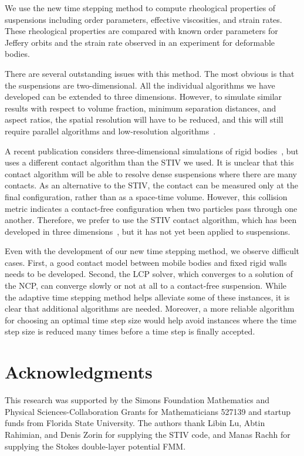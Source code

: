 \documentclass[AMA,STIX1COL]{WileyNJD-v2}
\begin{document}
We use the new time stepping method to compute rheological properties of
suspensions including order parameters, effective viscosities, and
strain rates.  These rheological properties are compared with known
order parameters for Jeffery orbits and the strain rate observed in an
experiment for deformable bodies.

There are several outstanding issues with this method. The most obvious
is that the suspensions are two-dimensional.  All the individual
algorithms we have developed can be extended to three dimensions.
However, to simulate similar results with respect to volume fraction,
minimum separation distances, and aspect ratios, the spatial resolution
will have to be reduced, and this will still require parallel algorithms
and low-resolution algorithms~\cite{Kabacogulu2017}.  

A recent publication considers three-dimensional simulations of rigid
bodies~\cite{cor-gre-rac-vee2017}, but uses a different contact
algorithm than the STIV we used.  It is unclear that this contact
algorithm will be able to resolve dense suspensions where there are many
contacts.  As an alternative to the STIV, the contact can be measured
only at the final configuration, rather than as a space-time volume.
However, this collision metric indicates a contact-free configuration
when two particles pass through one another.  Therefore, we prefer to
use the STIV contact algorithm, which has been developed in three
dimensions~\cite{Harmon2011}, but it has not yet been applied to
suspensions.

Even with the development of our new time stepping method, we observe
difficult cases.  First, a good contact model between mobile bodies and
fixed rigid walls needs to be developed.  Second, the LCP solver, which
converges to a solution of the NCP, can converge slowly or not at all to
a contact-free suspension.  While the adaptive time stepping method
helps alleviate some of these instances, it is clear that additional
algorithms are needed. Moreover, a more reliable algorithm for choosing
an optimal time step size would help avoid instances where the time step
size is reduced many times before a time step is finally accepted.

\section*{Acknowledgments}
This research was supported by the Simons Foundation Mathematics and
Physical Sciences-Collaboration Grants for Mathematicians 527139 and
startup funds from Florida State University.  The authors thank Libin
Lu, Abtin Rahimian, and Denis Zorin for supplying the STIV code, and
Manas Rachh for supplying the Stokes double-layer potential FMM.
\end{document}
